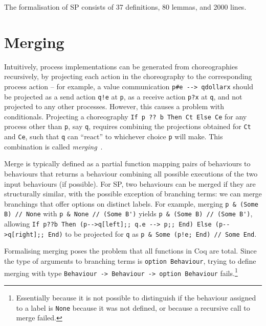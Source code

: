 \documentclass[runningheads]{llncs}
\begin{document}
The formalisation of SP consists of 37 definitions, 80 lemmas, and 2000 lines.

\section{Merging}
\label{sec:merging}

Intuitively, process implementations can be generated from choreographies recursively, by projecting
each action in the choreography to the corresponding process action -- for example, a value
communication \lstinline+p#e --> qdollarx+ should be projected as a send action \lstinline+q!e+ at
\lstinline+p+, as a receive action \lstinline+p?x+ at \lstinline+q+, and not projected to any other
processes.
%
However, this causes a problem with conditionals.
Projecting a choreography \lstinline+If p ?? b Then Ct Else Ce+ for any process other than
\lstinline+p+, say \lstinline+q+, requires combining the projections obtained for \lstinline+Ct+ and \lstinline+Ce+, such that \lstinline+q+ can ``react'' to whichever choice \lstinline+p+ will make.
This combination is called \emph{merging}~\cite{CHY12}.

Merge is typically defined as a partial function mapping pairs of behaviours to behaviours that
returns a behaviour combining all possible executions of the two input behaviours (if possible).
For SP, two behaviours can be merged if they are structurally similar, with the possible exception of branching terms: we can merge branchings that offer options on distinct labels.
For example, merging \lstinline+p & (Some B) // None+ with \lstinline+p & None // (Some B')+ yields \lstinline+p & (Some B) // (Some B')+,
allowing \lstinline+If p??b Then (p-->q[left];; q.e --> p;; End) Else (p-->q[right];; End)+ to be projected for \lstinline+q+ as \lstinline+p & Some (p!e; End) // Some End+.
% 

Formalising merging poses the problem that all functions in Coq are total.
Since the type of arguments to branching terms is \lstinline+option Behaviour+,
trying to define merging with type \lstinline+Behaviour -> Behaviour -> option Behaviour+ fails.\footnote{Essentially because it is not possible to distinguish if the behaviour assigned to a
  label is \lstinline+None+ because it was not defined, or because a recursive call to merge
  failed.}
\end{document}
